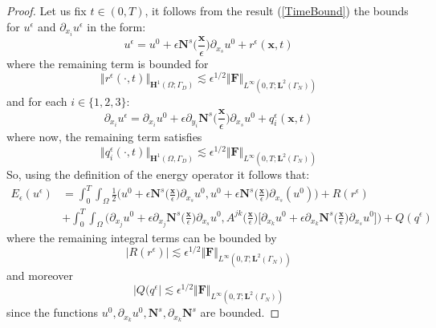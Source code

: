 \begin{proof}
Let us fix $t \in (0,T)$, it follows from the result (\ref{TimeBound}) the bounds for $u^{\epsilon}$ and $\partial_{x_i} u^{\epsilon}$ in the form:
\begin{equation*}
    u^{\epsilon} = u^0 + \epsilon \mathbf{N}^s\big( \frac{\mathbf{x}}{\epsilon} \big) \partial_{x_s} u^0 + r^{\epsilon}(\mathbf{x},t) 
\end{equation*}
where the remaining term is bounded for
\begin{equation*}
    \Vert r^{\epsilon}(\cdot, t) \Vert_{\mathbf{H}^1(\Omega; \Gamma_D)} \lesssim \epsilon^{1/2} \Vert \mathbf{F}\Vert_{L^{\infty}(0,T;\mathbf{L}^{2}(\Gamma_N))}
\end{equation*}
and for each $i \in \{1,2,3\}$:
\begin{equation*}
    \partial_{x_i} u^{\epsilon} = \partial_{x_i} u^0 + \epsilon \partial_{y_i} \mathbf{N}^s \big( \frac{\mathbf{x}}{\epsilon} \big) \partial_{x_s} u^0 + q^{\epsilon}_i(\mathbf{x},t)
\end{equation*}
where now, the remaining term satisfies 
\begin{equation*}
    \Vert q^{\epsilon}_i(\cdot, t) \Vert_{\mathbf{H}^1(\Omega, \Gamma_D)} \lesssim \epsilon^{1/2} \Vert \mathbf{F}\Vert_{L^{\infty}(0,T; \mathbf{L}^{2}(\Gamma_N))}
\end{equation*}
So, using the definition of the energy operator it follows that:
\begin{align*}
    E_{\epsilon}(u^{\epsilon}) &= \int_0^T \int_{\Omega} \frac{1}{2}(u^0 + \epsilon \mathbf{N}^s \big( \frac{\mathbf{x}}{\epsilon} \big) \partial_{x_s} u^0, u^0 + \epsilon \mathbf{N}^s \big( \frac{\mathbf{x}}{\epsilon} \big) \partial_{x_s} (u^0) \big) + R(r^{\epsilon}) \\
    & + \int_0^T \int_{\Omega} \big( \partial_{x_j} u^0 + \epsilon \partial_{x_j} \mathbf{N}^s \big( \frac{\mathbf{x}}{\epsilon} \big) \partial_{x_s} u^0, A^{jk} \big(\frac{\mathbf{x}}{\epsilon} \big) \big[\partial_{x_k} u^0 + \epsilon \partial_{x_k} \mathbf{N}^s \big( \frac{\mathbf{x}}{\epsilon}\big) \partial_{x_s} u^0 \big] \big) + Q(q^{\epsilon})
\end{align*}
where the remaining integral terms can be bounded by
\begin{equation*}
    \vert R(r^{\epsilon}) \vert \lesssim \epsilon^{1/2} \Vert \mathbf{F}\Vert_{L^{\infty}(0,T;\mathbf{L}^{2}(\Gamma_N))} 
\end{equation*}
and moreover
\begin{equation*}
    \vert Q(q^{\epsilon} \vert \lesssim \epsilon^{1/2} \Vert \mathbf{F}\Vert_{L^{\infty}(0,T;\mathbf{L}^{2}(\Gamma_N))}
\end{equation*}
since the functions $u^0, \partial_{x_k}u^0, \mathbf{N}^s, \partial_{x_k} \mathbf{N}^s$ are bounded.


\end{proof}
